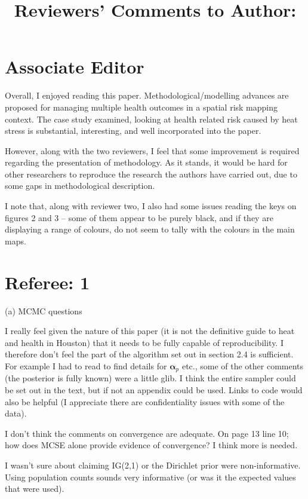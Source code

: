 \documentclass{article}
\begin{document}
\title{Reviewers' Comments to Author:}

\section{Associate Editor}


Overall, I enjoyed reading this paper. Methodological/modelling advances are proposed for managing multiple health outcomes in a spatial risk mapping context. The case study examined, looking at health related risk caused by heat stress is substantial, interesting, and well incorporated into the paper.

However, along with the two reviewers, I feel that some improvement is required regarding the presentation of methodology. As it stands, it would be hard for other researchers to reproduce the research the authors have carried out, due to some gaps in methodological description.

I note that, along with reviewer two, I also had some issues reading the keys on figures 2 and 3 – some of them appear to be purely black, and if they are displaying a range of colours, do not seem to tally with the colours in the main maps.


\section{Referee: 1}

(a) MCMC questions

I really feel given the nature of this paper (it is not the definitive guide to heat and health in Houston) that it needs to be fully capable of reproducibility.   I therefore don't feel the part of the algorithm set out in section 2.4 is sufficient.   For example I had to read to find details for $\boldsymbol{\alpha}_p$ etc., some of the other comments (the posterior is fully known) were a little glib.   I think the entire sampler could be set out in the text, but if not an appendix could be used.   Links to code would also be helpful (I appreciate there are confidentiality issues with some of the data).

I don't think the comments on convergence are adequate.   On page 13 line 10; how does MCSE alone provide evidence of convergence?   I think more is needed.

I wasn't sure about claiming IG(2,1) or the Dirichlet prior were non-informative.   Using population counts sounds very informative (or was it the expected values that were used).
\end{document}
